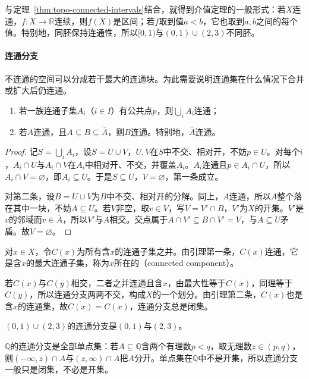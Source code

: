 与定理~\ref{thm:topo-connected-intervals}结合，就得到介值定理的一般形式：若$X$连通，$f:X\to\mathbb R$连续，则$f(X)$是区间；若$f$取到值$a<b$，它也取到$a,b$之间的每个值。特别地，同胚保持连通性，所以$[0,1)$与$(0,1)\cup(2,3)$不同胚。

\paragraph{连通分支}
不连通的空间可以分成若干最大的连通块。为此需要说明连通集在什么情况下合并或扩大后仍连通。

\begin{lemma}[连通集的并与闭包]
\label{lem:topo-connected-union-closure}
\begin{enumerate}
  \item 若一族连通子集$A_i$（$i\in I$）有公共点$p$，则$\bigcup_iA_i$连通；
  \item 若$A$连通，且$A\subseteq B\subseteq\overline A$，则$B$连通。特别地，$\overline A$连通。
\end{enumerate}
\end{lemma}
\begin{proof}
记$S=\bigcup_iA_i$，设$S=U\cup V$，$U,V$在$S$中不交、相对开，不妨$p\in U$。对每个$i$，$A_i\cap U$与$A_i\cap V$在$A_i$中相对开、不交，并覆盖$A_i$。$A_i$连通且$p\in A_i\cap U$，所以$A_i\cap V=\varnothing$，即$A_i\subseteq U$。于是$S\subseteq U$，$V=\varnothing$，第一条成立。

对第二条，设$B=U\cup V$为$B$中不交、相对开的分解。同上，$A$连通，所以$A$整个落在其中一块，不妨$A\subseteq U$。若$V$非空，取$v\in V$，写$V=V'\cap B$，$V'$为$X$的开集。$V'$是$v$的邻域而$v\in\overline A$，所以$V'$与$A$相交。交点属于$A\cap V'\subseteq B\cap V'=V$，与$A\subseteq U$矛盾。故$V=\varnothing$。
\end{proof}

对$x\in X$，令$C(x)$为所有含$x$的连通子集之并。由引理第一条，$C(x)$连通，它是含$x$的最大连通子集，称为$x$所在的（connected component）。

若$C(x)$与$C(y)$相交，二者之并连通且含$x$，由最大性等于$C(x)$，同理等于$C(y)$，所以连通分支两两不交，构成$X$的一个划分。由引理第二条，$\overline{C(x)}$也是含$x$的连通集，故$\overline{C(x)}=C(x)$，连通分支总是闭集。

\begin{example}[连通分支]
\label{ex:topo-components}
$(0,1)\cup(2,3)$的连通分支是$(0,1)$与$(2,3)$。

$\mathbb Q$的连通分支是全部单点集：若$A\subseteq\mathbb Q$含两个有理数$p<q$，取无理数$z\in(p,q)$，则$(-\infty,z)\cap A$与$(z,\infty)\cap A$把$A$分开。单点集在$\mathbb Q$中不是开集，所以连通分支一般只是闭集，不必是开集。
\end{example}

